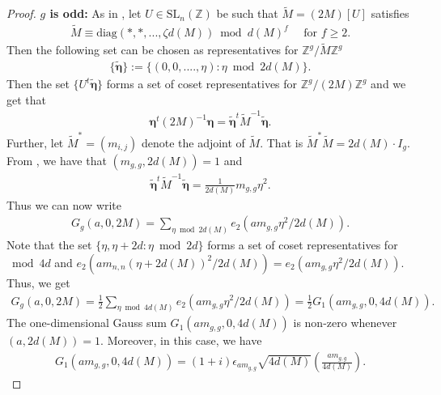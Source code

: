 \documentclass[11pt]{amsart}
\numberwithin{equation}{section}
\newcommand{\mbb}{\mathbb}
\newcommand{\mrm}{\mathrm} %
\newcommand{\slnz}{\mrm{SL}_n(\mbb Z)}
\newcommand{\q}{\quad}
\newcommand{\sumn}{\sum \nolimits}
\begin{document}
\begin{proof}

\textbf{$g$ is odd:} As in \cite{boche-das}, let $U\in\slnz$ be such that $\widetilde{M}=(2M)[U]$ satisfies
\begin{align*}
    \widetilde{M}\equiv\mrm{diag}(*, *,..., \zeta d(M)) \bmod d(M)^f \q \text{ for } f\ge 2.
\end{align*}
Then the following set can be chosen as representatives for $\mbb Z^g/ \widetilde{M} \mbb Z^g$
\begin{align}\label{coset-g-odd}
    \{ \bm{ \tilde \eta}\}:= \{ (0,0,....,\eta): \eta\bmod 2d(M)\}.
\end{align}
Then the set $\{ U^t\bm{\tilde \eta}\}$ forms a set of coset representatives for $\mbb Z^g/(2M)\mbb Z^g$ and we get that
\begin{align}
\bm{ \eta}^t (2M)^{-1} \bm{\eta}= \bm{ \tilde \eta}^t \widetilde{M}^{-1}\bm{ \tilde \eta}.
\end{align}
Further, let $\widetilde{M}^*=(m_{i,j})$ denote the adjoint of $\widetilde{M}.$ That is $\widetilde{M}^*\widetilde{M}=2d(M)\cdot I_g$. From \cite{boche-das}, we have that $(m_{g,g}, 2d(M))=1$ and 
\begin{align}
\bm{ \tilde \eta}^t \widetilde{M}^{-1}\bm{ \tilde \eta}= \frac{1}{2d(M)}m_{g,g}\eta^2.    
\end{align}
Thus we can now write
\begin{align}
    G_g(a, 0, 2M)= \sumn_{\eta\bmod 2d(M)}e_2(am_{g,g}\eta^2/2d(M)).
\end{align}
Note that the set $\{\eta, \eta+2d: \eta\bmod 2d\}$ forms a set of coset representatives for $\bmod 4d$ and $e_2(am_{n,n}(\eta+2d(M))^2/2d(M))=e_2(am_{g,g}\eta^2/2d(M)) $. Thus, we get
\begin{align}
 G_g(a, 0, 2M)= \frac{1}{2}\sum_{\eta\bmod 4d(M)}e_2(am_{g,g}\eta^2/2d(M))=\frac{1}{2}G_1(am_{g,g}, 0, 4d(M)).    
\end{align}
The one-dimensional Gauss sum $G_1(am_{g,g}, 0, 4d(M))$ is non-zero whenever $(a, 2d(M))=1$. Moreover, in this case, we have
\begin{align}
 G_1(am_{g,g}, 0, 4d(M))= (1+i) \epsilon_{am_{g,g}}\sqrt{4d(M)} \left(\frac{am_{g,g}}{4d(M)}\right).  
\end{align}


\end{proof}
\end{document}

